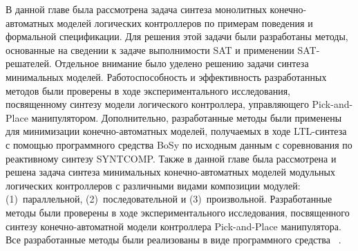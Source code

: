 \vspace{3ex}
\chapterconclusion

В данной главе была рассмотрена задача синтеза монолитных конечно-автоматных моделей логических контроллеров по примерам поведения и формальной спецификации.
Для решения этой задачи были разработаны методы, основанные на сведении к задаче выполнимости SAT и применении SAT-решателей.
Отдельное внимание было уделено решению задачи синтеза минимальных моделей.
Работоспособность и эффективность разработанных методов были проверены в ходе экспериментального исследования, посвященному синтезу модели логического контроллера, управляющего Pick-and-Place манипулятором.
Дополнительно, разработанные методы были применены для минимизации конечно-автоматных моделей, получаемых в ходе LTL-синтеза с помощью программного средства BoSy по исходным данным с соревнования по реактивному синтезу SYNTCOMP\@.
Также в данной главе была рассмотрена и решена задача синтеза минимальных конечно-автоматных моделей модульных логических контроллеров с различными видами композиции модулей: (1)~параллельной, (2)~последовательной и (3)~произвольной.
Разработанные методы были проверены в ходе экспериментального исследования, посвященного синтезу конечно-автоматной модели контроллера Pick-and-Place манипулятора.
Все разработанные методы были реализованы в виде программного средства ~\cite{fbSAT-tool}.
